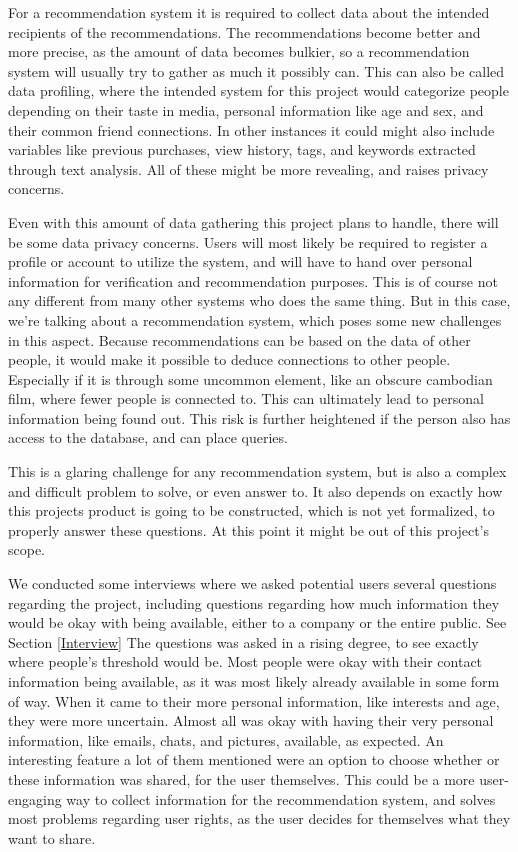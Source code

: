 For a recommendation system it is required to collect data about the intended recipients of the recommendations. The recommendations become better and more precise, as the amount of data becomes bulkier, so a recommendation system will usually try to gather as much it possibly can. This can also be called data profiling, where the intended system for this project would categorize people depending on their taste in media, personal information like age and sex, and their common friend connections. In other instances it could might also include variables like previous purchases, view history, tags, and keywords extracted through text analysis. All of these might be more revealing, and raises privacy concerns.\cite{UserRights2}

Even with this amount of data gathering this project plans to handle, there will be some data privacy concerns. Users will most likely be required to register a profile or account to utilize the system, and will have to hand over personal information for verification and recommendation purposes. This is of course not any different from many other systems who does the same thing. But in this case, we’re talking about a recommendation system, which poses some new challenges in this aspect. Because recommendations can be based on the data of other people, it would make it possible to deduce connections to other people. Especially if it is through some uncommon element, like an obscure cambodian film, where fewer people is connected to. This can ultimately lead to personal information being found out. This risk is further heightened if the person also has access to the database, and can place queries. \cite{UserRights1}

This is a glaring challenge for any recommendation system, but is also a complex and difficult problem to solve, or even answer to. It also depends on exactly how this projects product is going to be constructed, which is not yet formalized, to properly answer these questions. At this point it might be out of this project's scope.

We conducted some interviews where we asked potential users several questions regarding the project, including questions regarding how much information they would be okay with being available, either to a company or the entire public. See Section \ref{Interview} The questions was asked in a rising degree, to see exactly where people’s threshold would be. Most people were okay with their contact information being available, as it was most likely already available in some form of way. When it came to their more personal information, like interests and age, they were more uncertain. Almost all was okay with having their very personal information, like emails, chats, and pictures, available, as expected. An interesting feature a lot of them mentioned were an option to choose whether or these information was shared, for the user themselves. This could be a more user-engaging way to collect information for the recommendation system, and solves most problems regarding user rights, as the user decides for themselves what they want to share.
